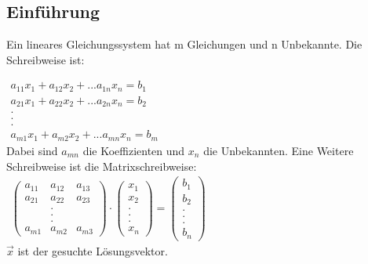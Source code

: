 \documentclass[a4paper,10pt]{scrartcl}
\begin{document}
        \subsection{Einführung}
        Ein lineares Gleichungssystem hat m Gleichungen und n Unbekannte. Die Schreibweise ist:
        
        $\begin{array}{c}
            a_{11}x_1 + a_{12}x_2 + ... a_{1n}x_n = b_1 \\
            a_{21}x_1 + a_{22}x_2 + ... a_{2n}x_n = b_2 \\
                        . \\ . \\ . \\
            a_{m1}x_1 + a_{m2}x_2 + ... a_{mn}x_n = b_m
        \end{array}$
        \\Dabei sind $a_{mn}$ die Koeffizienten und $x_n$ die Unbekannten. Eine Weitere Schreibweise ist die Matrixschreibweise: \\
        
        $\begin{array}{c}
            \begin{pmatrix}
                a_{11} & a_{12} & a_{13}\\
                a_{21} & a_{22} & a_{23} \\
                 & . &  \\
                 & . & \\
                 & . & \\ 
                a_{m1} & a_{m2} & a_{m3}
                \end{pmatrix}
                \cdot
            \begin{pmatrix}
                x_1 \\
                x_2 \\
                . \\
                .\\
                .\\
                x_n
            \end{pmatrix}
                =
            \begin{pmatrix}
                b_1 \\
                b_2 \\
                . \\
                .\\
                .\\
                b_n
            \end{pmatrix}
        \end{array}$ 
        \\$\vec{x}$ ist der gesuchte Lösungsvektor.
\end{document}
